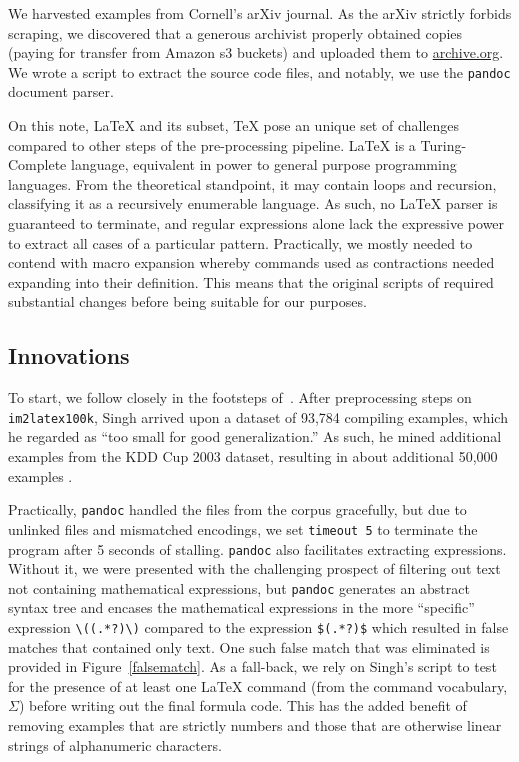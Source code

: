 \documentclass[12pt]{article}
\begin{document}
We harvested examples from Cornell's arXiv journal. As the arXiv strictly
forbids scraping, we discovered that a generous archivist properly obtained
copies (paying for transfer from Amazon s3 buckets) and uploaded them to
\url{archive.org}. We wrote a script to extract the source code files, and
notably, we use the \texttt{pandoc} document parser.

On this note, \LaTeX{} and its subset, \TeX{} pose an unique set of challenges
compared to other steps of the pre-processing pipeline. \LaTeX{} is a
Turing-Complete language, equivalent in power to general purpose programming
languages. From the theoretical standpoint, it may contain loops and recursion,
classifying it as a recursively enumerable language. As such, no \LaTeX{} parser
is guaranteed to terminate, and regular expressions alone lack the expressive
power to extract all cases of a particular pattern. Practically, we mostly
needed to contend with macro expansion whereby commands used as contractions
needed expanding into their definition. This means that the original scripts of
\cite{deng2016you} required substantial changes before being suitable for our
purposes.

\subsection{Innovations}
\label{datainnov}

To start, we follow closely in the footsteps of~\citeauthor{singh2018teaching}. After
preprocessing steps on \texttt{im2latex100k}, Singh arrived upon a dataset of
93,784 compiling examples, which he regarded as ``too small for good
generalization.'' As such, he mined additional examples from the KDD Cup 2003
dataset, resulting in about additional 50,000 examples
\parencite[8]{singh2018teaching}.  %

Practically, \texttt{pandoc} handled the files from the corpus gracefully, but
due to unlinked files and mismatched encodings, we set \texttt{timeout 5} to
terminate the program after 5 seconds of stalling. \texttt{pandoc} also
facilitates extracting expressions. Without it, we were presented with the
challenging prospect of filtering out text not containing mathematical
expressions, but \texttt{pandoc} generates an abstract syntax tree and encases
the mathematical expressions in the more ``specific'' expression
\verb|\((.*?)\)| compared to the expression \texttt{\$(.*?)\$} which resulted in
false matches that contained only text. One such false match that was eliminated
is provided in Figure~\ref{falsematch}. As a fall-back, we rely on Singh's script to test
for the presence of at least one \LaTeX{} command (from the command vocabulary,
$\Sigma$) before writing out the final formula code. This has the added benefit
of removing examples that are strictly numbers and those that are otherwise
linear strings of alphanumeric characters.
\end{document}
